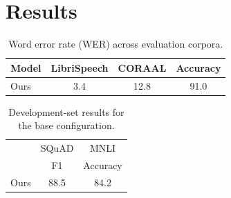 \documentclass{article}
\begin{document}
\section{Results}

\begin{table}
\caption{Word error rate (WER) across evaluation corpora.}
\begin{tabular}{lccc}
Model & LibriSpeech & CORAAL & Accuracy \\
\hline
Ours & 3.4 & 12.8 & 91.0 \\
\end{tabular}
\end{table}

\begin{table}
\begin{tabular}{lcc}
 & SQuAD & MNLI \\
 & F1 & Accuracy \\
\hline
Ours & 88.5 & 84.2 \\
\end{tabular}
\caption{Development-set results for the base configuration.}
\end{table}
\end{document}
